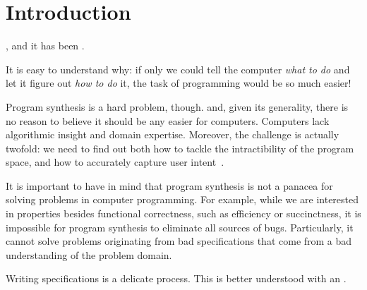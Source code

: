 \chapter{Introduction}
\label{chapter:introduction}


 , and it has been
.

It is easy to understand why: if only we could tell the computer \textit{what to
do} and let it figure out \textit{how to do} it, the task of programming would
be so much easier!

Program synthesis is a hard problem, though.  and, given its generality,
there is no reason to believe it should be any easier for computers. Computers
lack algorithmic insight and domain expertise. Moreover, the challenge is
actually twofold: we need to find out both how to tackle the intractibility of
the program space, and how to accurately capture user intent~\cite{Gulwani2017}.


It is important to have in mind that program synthesis is not a panacea for
solving problems in computer programming. For example, while we are interested
in properties besides functional correctness, such as efficiency or
succinctness, it is impossible for program synthesis to eliminate all sources of
bugs. Particularly, it cannot solve problems originating from bad specifications
that come from a bad understanding of the problem domain.

Writing specifications is a delicate process. This is better understood with an
.


